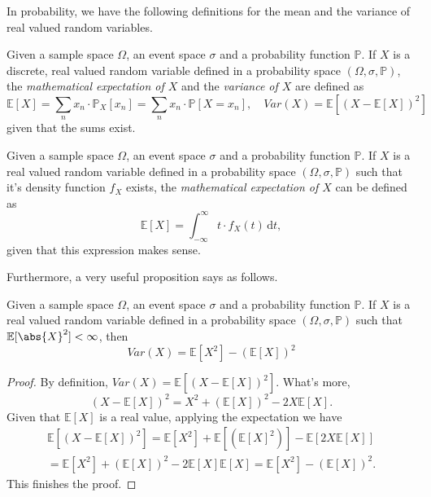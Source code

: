 In probability, we have the following definitions for the mean and the variance of real valued random variables.\\

\begin{Def}
    Given a sample space $\Omega$, an event space $\sigma$ and a probability function $\mathbb{P}$. If $X$ is a discrete, real valued random variable defined in a probability space $(\Omega, \sigma, \mathbb{P})$, the \textit{mathematical expectation of $X$} and the \textit{variance of $X$} are defined as
    \begin{equation*}
        \mathbb{E}[X]=\sum_n x_n \cdot \mathbb{P}_X[x_n] = \sum_n x_n \cdot \mathbb{P}[X=x_n], \quad Var(X)=\mathbb{E}[(X-\mathbb{E}[X])^2]
    \end{equation*}
    given that the sums exist.
\end{Def}
\vspace{2mm}
\begin{Def}
    Given a sample space $\Omega$, an event space $\sigma$ and a probability function $\mathbb{P}$. If $X$ is a real valued random variable defined in a probability space $(\Omega, \sigma, \mathbb{P})$ such that it's density function $f_X$ exists, the \textit{mathematical expectation of $X$} can be defined as
    \begin{equation*}
        \mathbb{E}[X]=\int_{-\infty}^{\infty} t \cdot f_X(t)\,\mathrm{d}t,
    \end{equation*}
    given that this expression makes sense.
\end{Def}

\vspace{2mm}
Furthermore, a very useful proposition says as follows.\\

\begin{Prop}
    Given a sample space $\Omega$, an event space $\sigma$  and a probability function $\mathbb{P}$. If $X$ is a real valued random variable defined in a probability space $(\Omega,\sigma,\mathbb{P})$ such that $\mathbb{E}[\abs{X}^2]<\infty$, then
    \begin{equation*}
        Var(X)=\mathbb{E}[X^2]-(\mathbb{E}[X])^2
    \end{equation*}
\end{Prop}
\begin{proof} By definition, $Var(X)=\mathbb{E}[(X-\mathbb{E}[X])^2]$. What's more, $$ (X-\mathbb{E}[X])^2 = X^2 + (\mathbb{E}[X])^2 - 2X\mathbb{E}[X]. $$
Given that $\mathbb{E}[X]$ is a real value, applying the expectation we have
\begin{multline*}
    \mathbb{E}[(X-\mathbb{E}[X])^2] = \mathbb{E}[X^2] + \mathbb{E}[(\mathbb{E}[X]^2)] - \mathbb{E}[2X\mathbb{E}[X]] \\ = \mathbb{E}[X^2] + (\mathbb{E}[X])^2 - 2\mathbb{E}[X]\mathbb{E}[X] = \mathbb{E}[X^2] - (\mathbb{E}[X])^2.
\end{multline*}
This finishes the proof.
\end{proof}
\vspace{2mm}

